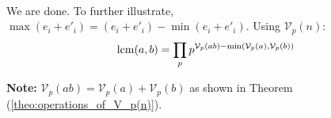 \begin{Proof}
\[\begin{array}{ccc|c|c}
    \end{array}
    \]

    \noindent
    We are done.
    To further illustrate, $\max(e_i+e'_i) = (e_i+e'_i)-\min(e_i+e'_i)$. Using $\mathcal{V}_p(n)$:\\
    \LARGE
    \[
        \operatorname{lcm}(a, b) = \prod_{p} p^{\mathcal{V}_p(ab)- \min(\mathcal{V}_p(a),\mathcal{V}_p(b))}
    \]
    \normalsize



    
    \end{Proof}

    \begin{Note}
        \textbf{Note:} $\mathcal{V}_p(ab)= \mathcal{V}_p(a) + \mathcal{V}_p(b)$ as shown in Theorem (\ref{theo:operations_of_V_p(n)}).
    \end{Note}






